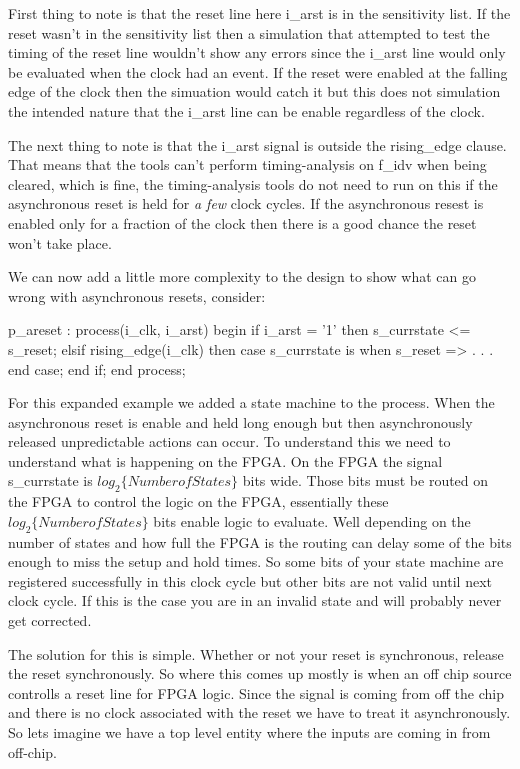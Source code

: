 First thing to note is that the reset line here i\_arst is in the sensitivity list. If the reset wasn't in the sensitivity list then a simulation that attempted to test the timing of the reset line wouldn't show any errors since the i\_arst line would only be evaluated when the clock had an event. If the reset were enabled at the falling edge of the clock then the simuation would catch it but this does not simulation the intended nature that the i\_arst line can be enable regardless of the clock. 

The next thing to note is that the i\_arst signal is outside the rising\_edge clause. That means that the tools can't perform timing-analysis on f\_idv when being cleared, which is fine, the timing-analysis tools do not need to run on this if the asynchronous reset is held for \emph{a few} clock cycles. If the asynchronous resest is enabled only for a fraction of the clock then there is a good chance the reset won't take place. 

We can now add a little more complexity to the design to show what can go wrong with asynchronous resets, consider:

\begin{VHDLlisting}[tabsize=8]
p_areset : process(i_clk, i_arst)
begin
	if i_arst = '1' then
		s_currstate <= s_reset;
	elsif rising_edge(i_clk) then
		case s_currstate is
			when s_reset => 
			.
			.
			.
		end case;
	end if;
end process;
\end{VHDLlisting}

For this expanded example we added a state machine to the process. When the asynchronous reset is enable and held long enough but then asynchronously released unpredictable actions can occur. To understand this we need to understand what is happening on the \ac{FPGA}. On the \ac{FPGA} the signal s\_currstate is $log_2\{Number of States\}$ bits wide. Those bits must be routed on the \ac{FPGA} to control the logic on the \ac{FPGA}, essentially these $log_2\{Number of States\}$ bits enable logic to evaluate. Well depending on the number of states and how full the \ac{FPGA} is the routing can delay some of the bits enough to miss the setup and hold times. So some bits of your state machine are registered successfully in this clock cycle but other bits are not valid until next clock cycle. If this is the case you are in an invalid state and will probably never get corrected. 

The solution for this is simple. Whether or not your reset is synchronous, release the reset synchronously. So where this comes up mostly is when an off chip source controlls a reset line for \ac{FPGA} logic. Since the signal is coming from off the chip and there is no clock associated with the reset we have to treat it asynchronously. So lets imagine we have a top level entity where the inputs are coming in from off-chip. 

